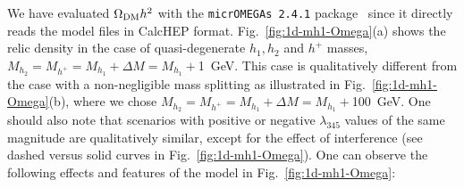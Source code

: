 \documentclass[12pt,a4paper]{article}
\begin{document}
We have evaluated $\Omega_{\rm DM} h^2$ with the
{\texttt{micrOMEGAs 2.4.1}} package~\cite{Belanger:2013oya,Belanger:2006is, Belanger:2010gh}
since it directly reads the model files in CalcHEP format.
Fig.~\ref{fig:1d-mh1-Omega}(a) shows the relic density in the case of quasi-degenerate $h_1,h_2$ and $h^+$ masses, 
$M_{h_2}=M_{h^+}=M_{h_1}+\Delta M= M_{h_1}+$1~GeV.
This case is qualitatively different from the case with a non-negligible mass splitting
as illustrated in Fig.~\ref{fig:1d-mh1-Omega}(b), where we chose  $M_{h_2}=M_{h^+}=M_{h_1}+\Delta M=M_{h_1}+$100~GeV.
One should also note that scenarios with positive or negative $\lambda_{345}$ values of the same magnitude
are qualitatively similar, except for the effect of interference (see dashed versus solid curves in Fig.~\ref{fig:1d-mh1-Omega}). 
One can observe the following effects and features of the model in Fig.~\ref{fig:1d-mh1-Omega}:
\end{document}
